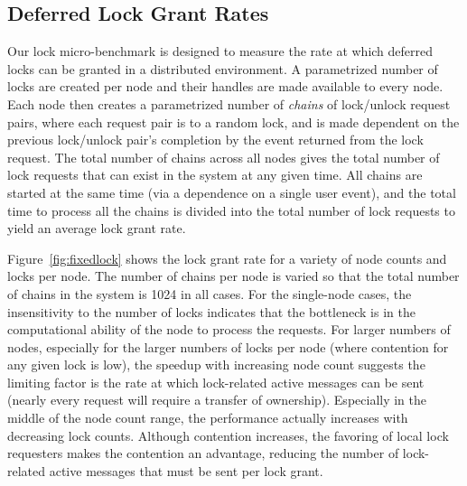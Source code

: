 \subsection{Deferred Lock Grant Rates}
\label{subsec:lockmicro}

Our lock micro-benchmark is designed to measure the rate at which deferred locks can be granted
in a distributed environment.
A parametrized number of locks are created per node and their handles are made available to
every node.  Each node then creates a parametrized number of {\em chains} of lock/unlock
request pairs, where each request pair is to a random lock, and is made dependent on the 
previous lock/unlock pair's completion by the event returned from the lock request.  
The total number of chains across all nodes gives the total
number of lock requests that can exist in the system at any given time.  All chains are
started at the same time (via a dependence on a single user event), and the total time to
process all the chains is divided into the total number of lock requests to yield an average
lock grant rate.


Figure~\ref{fig:fixedlock} shows the lock grant rate for a variety of node counts and locks
per node.  The number of chains per node is varied so that the total number of chains in the system
is 1024 in all cases.  For the single-node cases, the insensitivity to the number of locks indicates
that the bottleneck is in the computational ability of the node to process the requests. 
For larger numbers of nodes, especially for the larger numbers of locks per node (where contention
for any given lock is low), the speedup with increasing node count suggests the limiting factor is
the rate at which lock-related active messages can be sent (nearly every request will require a
transfer of ownership).  Especially in the middle of the node count range, the performance actually
increases with
decreasing lock counts.  Although contention increases, the favoring of local lock requesters makes
the contention an advantage, reducing the number of lock-related active messages that must be sent
per lock grant.

